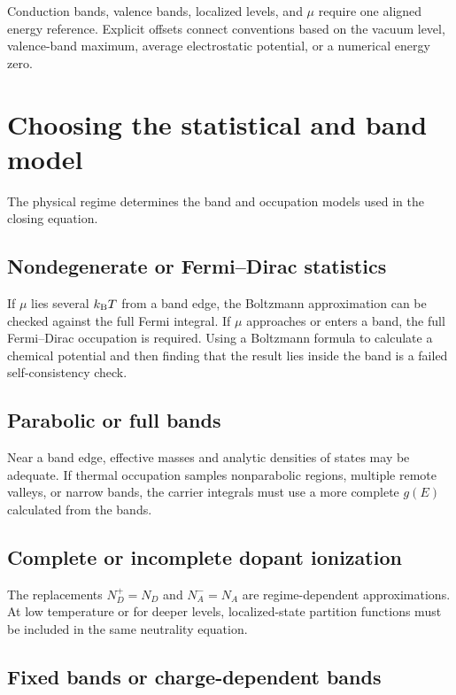 Conduction bands, valence bands, localized levels, and $\mu$ require one aligned
energy reference.  Explicit offsets connect conventions based on the vacuum
level, valence-band maximum, average electrostatic potential, or a numerical
energy zero.

\section{Choosing the statistical and band model}

The physical regime determines the band and occupation models used in the
closing equation.

\subsection{Nondegenerate or Fermi--Dirac statistics}

If $\mu$ lies several $k_{\mathrm B} T$ from a band edge, the Boltzmann approximation can
be checked against the full Fermi integral.  If $\mu$ approaches or enters a
band, the full Fermi--Dirac occupation is required.  Using a Boltzmann formula
to calculate a chemical potential and then finding that the result lies inside
the band is a failed self-consistency check.

\subsection{Parabolic or full bands}

Near a band edge, effective masses and analytic densities of states may be
adequate.  If thermal occupation samples nonparabolic regions, multiple remote
valleys, or narrow bands, the carrier integrals must use a more complete
$g(E)$ calculated from the bands.

\subsection{Complete or incomplete dopant ionization}

The replacements $N_D^+=N_D$ and $N_A^-=N_A$ are regime-dependent
approximations.  At low temperature or for deeper levels, localized-state
partition functions must be included in the same neutrality equation.

\subsection{Fixed bands or charge-dependent bands}

